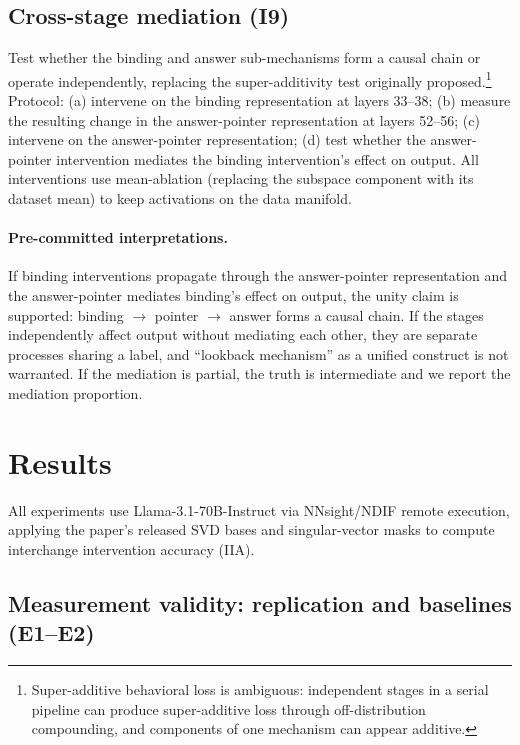 \documentclass{article}
\begin{document}
\subsection{Cross-stage mediation (I9)}
\label{sec:mediation}

Test whether the binding and answer sub-mechanisms form a causal chain or operate independently, replacing the super-additivity test originally proposed.\footnote{Super-additive behavioral loss is ambiguous: independent stages in a serial pipeline can produce super-additive loss through off-distribution compounding, and components of one mechanism can appear additive.} Protocol: (a) intervene on the binding representation at layers 33--38; (b) measure the resulting change in the answer-pointer representation at layers 52--56; (c) intervene on the answer-pointer representation; (d) test whether the answer-pointer intervention mediates the binding intervention's effect on output. All interventions use mean-ablation (replacing the subspace component with its dataset mean) to keep activations on the data manifold.

\paragraph{Pre-committed interpretations.} If binding interventions propagate through the answer-pointer representation and the answer-pointer mediates binding's effect on output, the unity claim is supported: binding $\to$ pointer $\to$ answer forms a causal chain. If the stages independently affect output without mediating each other, they are separate processes sharing a label, and ``lookback mechanism'' as a unified construct is not warranted. If the mediation is partial, the truth is intermediate and we report the mediation proportion.


\section{Results}
\label{sec:results}

All experiments use Llama-3.1-70B-Instruct via NNsight/NDIF remote execution, applying the paper's released SVD bases and singular-vector masks to compute interchange intervention accuracy (IIA).

\subsection{Measurement validity: replication and baselines (E1--E2)}
\end{document}
